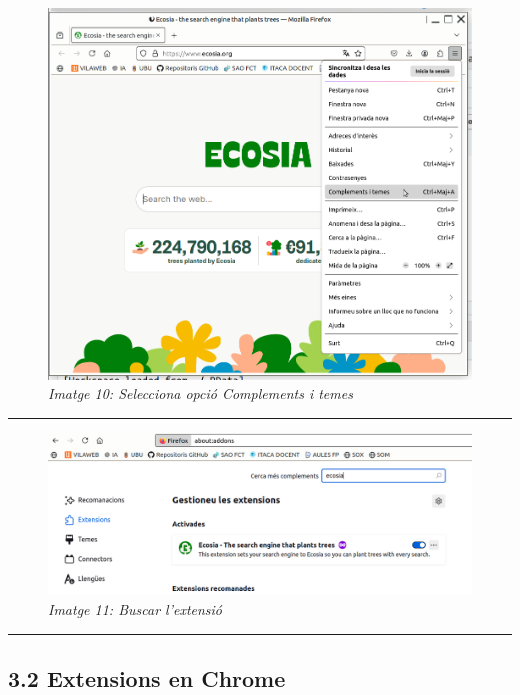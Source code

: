 \documentclass[
  a4paper,
]{article}
\begin{document}
\begin{figure}
\centering
\includegraphics{png/0-ExtensionsFirefox.png}
\caption{\emph{Imatge 10: Selecciona opció Complements i temes}}
\end{figure}

\begin{center}\rule{0.5\linewidth}{0.5pt}\end{center}

\begin{figure}
\centering
\includegraphics{png/1-ExtensionsFirefox.png}
\caption{\emph{Imatge 11: Buscar l'extensió}}
\end{figure}

\begin{center}\rule{0.5\linewidth}{0.5pt}\end{center}

\subsection{3.2 Extensions en Chrome}\label{extensions-en-chrome}
\end{document}
